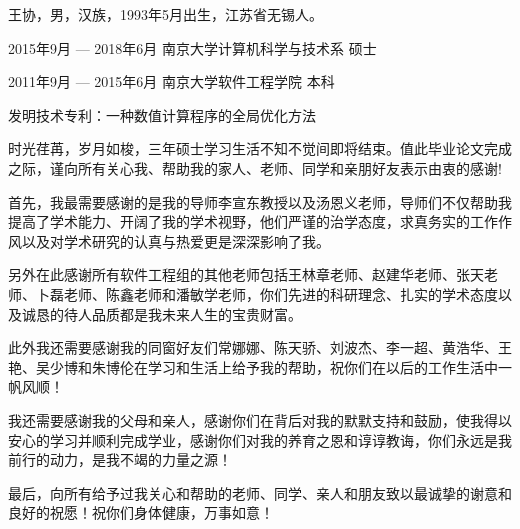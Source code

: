 \documentclass[master,macfonts]{njuthesis}
\begin{document}
\backmatter
\begin{resume}
\begin{authorinfo}
\noindent 王协，男，汉族，1993年5月出生，江苏省无锡人。
\end{authorinfo}
\begin{education}
\item[2015年9月 --- 2018年6月] 南京大学计算机科学与技术系 \hfill 硕士
\item[2011年9月 --- 2015年6月] 南京大学软件工程学院 \hfill 本科
\end{education}
\begin{publications}
\item 发明技术专利：一种数值计算程序的全局优化方法
\end{publications}
\end{resume}

\begin{acknowledgement}

时光荏苒，岁月如梭，三年硕士学习生活不知不觉间即将结束。值此毕业论文完成之际，谨向所有关心我、帮助我的家人、老师、同学和亲朋好友表示由衷的感谢!

首先，我最需要感谢的是我的导师李宣东教授以及汤恩义老师，导师们不仅帮助我提高了学术能力、开阔了我的学术视野，他们严谨的治学态度，求真务实的工作作风以及对学术研究的认真与热爱更是深深影响了我。

另外在此感谢所有软件工程组的其他老师包括王林章老师、赵建华老师、张天老师、卜磊老师、陈鑫老师和潘敏学老师，你们先进的科研理念、扎实的学术态度以及诚恳的待人品质都是我未来人生的宝贵财富。

此外我还需要感谢我的同窗好友们常娜娜、陈天骄、刘波杰、李一超、黄浩华、王艳、吴少博和朱博伦在学习和生活上给予我的帮助，祝你们在以后的工作生活中一帆风顺！

我还需要感谢我的父母和亲人，感谢你们在背后对我的默默支持和鼓励，使我得以安心的学习并顺利完成学业，感谢你们对我的养育之恩和谆谆教诲，你们永远是我前行的动力，是我不竭的力量之源！

最后，向所有给予过我关心和帮助的老师、同学、亲人和朋友致以最诚挚的谢意和良好的祝愿！祝你们身体健康，万事如意！

\end{acknowledgement}


\makelicense

\end{document}
